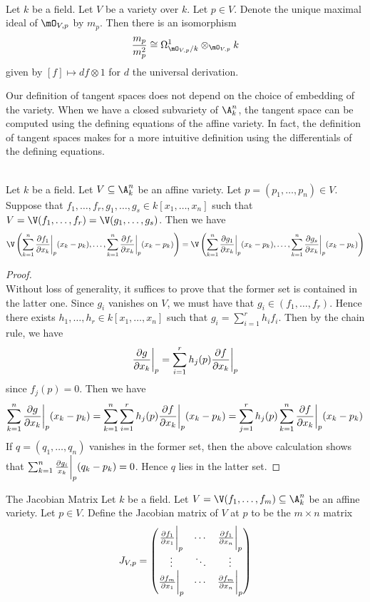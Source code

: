\documentclass[a4paper]{article}
\begin{document}
\begin{prp}{}{}\\
Let $k$ be a field. Let $V$ be a variety over $k$. Let $p\in V$. Denote the unique maximal ideal of $\mO_{V,p}$ by $m_p$. Then there is an isomorphism $$\frac{m_p}{m_p^2}\cong\Omega_{\mO_{V,p}/k}^1\otimes_{\mO_{V,p}} k$$ given by $[f]\mapsto df\otimes 1$ for $d$ the universal derivation. 
\end{prp}

Our definition of tangent spaces does not depend on the choice of embedding of the variety. When we have a closed subvariety of $\A_k^n$, the tangent space can be computed using the defining equations of the affine variety. In fact, the definition of tangent spaces makes for a more intuitive definition using the differentials of the defining equations. 

\begin{prp}{}{}\\
Let $k$ be a field. Let $V\subseteq\A_k^n$ be an affine variety. Let $p=(p_1,\dots,p_n)\in V$. Suppose that $f_1,\dots,f_r,g_1,\dots,g_s\in k[x_1,\dots,x_n]$ such that $V=\V(f_1,\dots,f_r)=\V(g_1,\dots,g_s)$. Then we have $$\V\left(\sum_{k=1}^n\frac{\partial f_1}{\partial x_k}\bigg{|}_p(x_k-p_k),\dots,\sum_{k=1}^n\frac{\partial f_r}{\partial x_k}\bigg{|}_p(x_k-p_k)\right)=\V\left(\sum_{k=1}^n\frac{\partial g_1}{\partial x_k}\bigg{|}_p(x_k-p_k),\dots,\sum_{k=1}^n\frac{\partial g_s}{\partial x_k}\bigg{|}_p(x_k-p_k)\right)$$
\begin{proof}\\
Without loss of generality, it suffices to prove that the former set is contained in the latter one. Since $g_i$ vanishes on $V$, we must have that $g_i\in(f_1,\dots,f_r)$. Hence there exists $h_1,\dots,h_r\in k[x_1,\dots,x_n]$ such that $g_i=\sum_{i=1}^rh_if_i$. Then by the chain rule, we have $$\frac{\partial g}{\partial x_k}\bigg{|}_p=\sum_{i=1}^rh_j(p)\frac{\partial f}{\partial x_k}\bigg{|}_p$$ since $f_j(p)=0$. Then we have $$\sum_{k=1}^n\frac{\partial g}{\partial x_k}\bigg{|}_p(x_k-p_k)=\sum_{k=1}^n\sum_{i=1}^rh_j(p)\frac{\partial f}{\partial x_k}\bigg{|}_p(x_k-p_k)=\sum_{j=1}^rh_j(p)\sum_{k=1}^n\frac{\partial f}{\partial x_k}\bigg{|}_p(x_k-p_k)$$ If $q=(q_1,\dots,q_n)$ vanishes in the former set, then the above calculation shows that $\sum_{k=1}^n\frac{\partial g_i}{x_k}\bigg{|}_p(q_k-p_k)=0$. Hence $q$ lies in the latter set. 
\end{proof}
\end{prp}

\begin{defn}{The Jacobian Matrix}{} Let $k$ be a field. Let $V=\V(f_1,\dots,f_m)\subseteq\A_k^n$ be an affine variety. Let $p\in V$. Define the Jacobian matrix of $V$ at $p$ to be the $m\times n$ matrix $$J_{V,p}=\begin{pmatrix}
\frac{\partial f_1}{\partial x_1}\bigg{|}_p & \cdots & \frac{\partial f_1}{\partial x_n}\bigg{|}_p\\
\vdots & \ddots & \vdots\\
\frac{\partial f_m}{\partial x_1}\bigg{|}_p & \cdots & \frac{\partial f_m}{\partial x_n}\bigg{|}_p
\end{pmatrix}$$
\end{defn}
\end{document}
